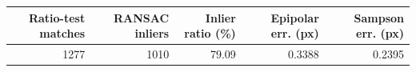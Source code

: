\begin{tabular}{rrrrr}
\toprule
Ratio-test matches & RANSAC inliers & Inlier ratio (\%) & Epipolar err. (px) & Sampson err. (px) \\
\midrule
1277 & 1010 & 79.09 & 0.3388 & 0.2395 \\
\bottomrule
\end{tabular}
